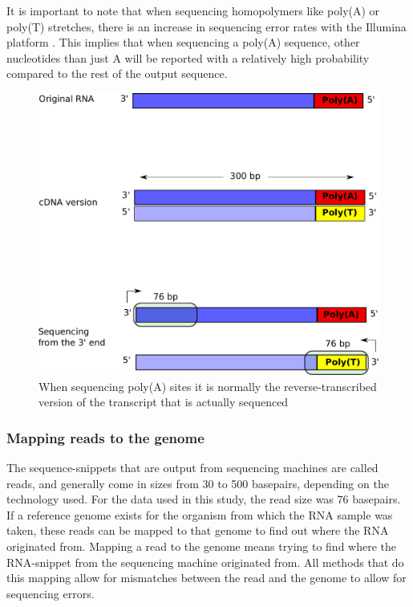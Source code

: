 It is important to note that when sequencing homopolymers like poly(A) or
poly(T) stretches, there is an increase in sequencing error rates with the
Illumina platform \cite{minoche_evaluation_2011}. This implies that when
sequencing a poly(A) sequence, other nucleotides than just A will be reported
with a relatively high probability compared to the rest of the output sequence.

\begin{figure}[htb]
	\begin{center}
		\includegraphics[scale=0.4]{figures/introduction/polyT_sequencing.pdf}
	\end{center}
	\caption{When sequencing poly(A) sites it is normally the
	reverse-transcribed version of the transcript that is actually sequenced}
	\label{fig:polyT_seq}
\end{figure}

\subsubsection{Mapping reads to the genome}
The sequence-snippets that are output from sequencing machines are called
reads, and generally come in sizes from 30 to 500 basepairs, depending on the
technology used. For the data used in this study, the read size was 76
basepairs. If a reference genome exists for the organism from which the RNA
sample was taken, these reads can be mapped to that genome to find out where
the RNA originated from. Mapping a read to the genome means trying to find
where the RNA-snippet from the sequencing machine originated from. All methods
that do this mapping allow for mismatches between the read and the genome to
allow for sequencing errors. 
